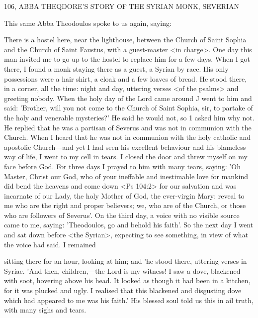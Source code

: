 106, ABBA THEQDORE'S STORY OF THE
SYRIAN MONK, SEVERIAN

This same Abba Theodoulos spoke to us again, saying:

There is a hostel here, near the lighthouse, between the Church of
Saint Sophia and the Church of Saint Faustus, with a guest-master
<in charge>. One day this man invited me to go up to the hostel to
replace him for a few days. When I got there, I found a monk
staying there as a guest, a Syrian by race. His only possessions were
a hair shirt, a cloak and a few loaves of bread. He stood there, in
a corner, all the time: night and day, uttering verses <of the
psalms> and greeting nobody. When the holy day of the Lord came
around J went to him and said: 'Brother, will you not come to the
Church of Saint Sophia, sir, to partake of the holy and venerable
mysteries?' He said he would not, so 1 asked him why not. He
replied that he was a partisan of Severus and was not in communion
with the Church. When I heard that he was not in communion with
the holy catholic and apostolic Church—and yet I had seen his
excellent behaviour and his blameless way of life, I went to my cell
in tears. I closed the door and threw myself on my face before God.
For three days I prayed to him with many tears, saying: 'Oh
Master, Christ our God, who of your ineffable and inestimable love
for mankind did bend the heavens and come down <Ps 104:2> for
our salvation and was incarnate of our Lady, the holy Mother of
God, the ever-virgin Mary: reveal to me who are the right and
proper believers; we, who are of the Church, or those who are
followers of Severus'. On the third day, a voice with no visible
source came to me, saying: 'Theodoulos, go and behold his faith'.
So the next day I went and sat down before <the Syrian>, expecting
to see something, in view of what the voice had said. I remained

sitting there for an hour, looking at him; and 'he stood there,
uttering verses in Syriac. 'And then, children,—the Lord is my
witness! I saw a dove, blackened with soot, hovering above his head.
It looked as though it had been in a kitchen, for it was plucked and
ugly. I realised that this blackened and disgusting dove which had
appeared to me was his faith.' His blessed soul told us this in ail
truth, with many sighs and tears.

